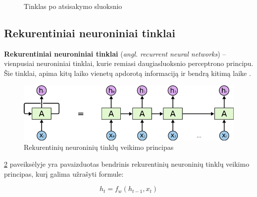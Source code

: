 \documentclass{VUMIFPSbakalaurinis}
\begin{document}
\begin{figure}[H]
\begin{minipage}{.4\textwidth}
		\caption{Tinklas po atsisakymo sluoksnio} \label{fig:sdnn}
	\end{minipage}
\end{figure}


\subsection{Rekurentiniai neuroniniai tinklai}

\textbf{Rekurentiniai neuroniniai tinklai} (\textit{angl. recurrent neural networks}) – vienpusiai neuroniniai tinklai, kurie remiasi daugiasluoksnio perceptrono principu. Šie tinklai, apima kitų laiko vienetų apdorotą informaciją ir bendrą kitimą laike \cite{DBLP:journals/corr/Lipton15}.


\begin{figure}[H]
	\centering
	\includegraphics[scale=0.4]{img/rnn}
	\caption{Rekurentinių neuroninių tinklų veikimo principas}
	\label{img:rnn}
\end{figure}

\ref{img:rnn} paveiksėlyje yra pavaizduotas bendrinis rekurentinių neuroninių tinklų veikimo principas, kurį galima užrašyti formule:

\begin{equation}\label{eq:rnn}
h_t = f_w(h_{t-1}, x_t)
\end{equation}
\end{document}
